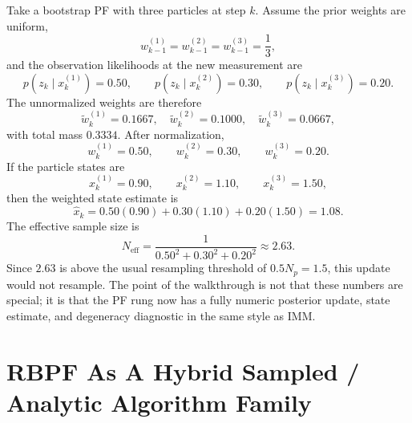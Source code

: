 \documentclass[11pt]{article}
\begin{document}
Take a bootstrap PF with three particles at step \(k\). Assume the prior
weights are uniform,
\begin{equation}
    w_{k-1}^{(1)} = w_{k-1}^{(2)} = w_{k-1}^{(3)} = \frac{1}{3},
\end{equation}
and the observation likelihoods at the new measurement are
\begin{equation}
    p(z_k \mid x_k^{(1)}) = 0.50,\qquad
    p(z_k \mid x_k^{(2)}) = 0.30,\qquad
    p(z_k \mid x_k^{(3)}) = 0.20.
\end{equation}
The unnormalized weights are therefore
\begin{equation}
    \tilde{w}_k^{(1)} = 0.1667,\quad
    \tilde{w}_k^{(2)} = 0.1000,\quad
    \tilde{w}_k^{(3)} = 0.0667,
\end{equation}
with total mass \(0.3334\). After normalization,
\begin{equation}
    w_k^{(1)} = 0.50,\qquad
    w_k^{(2)} = 0.30,\qquad
    w_k^{(3)} = 0.20.
\end{equation}
If the particle states are
\begin{equation}
    x_k^{(1)} = 0.90,\qquad
    x_k^{(2)} = 1.10,\qquad
    x_k^{(3)} = 1.50,
\end{equation}
then the weighted state estimate is
\begin{equation}
    \hat{x}_k
    =
    0.50(0.90) + 0.30(1.10) + 0.20(1.50)
    =
    1.08.
\end{equation}
The effective sample size is
\begin{equation}
    N_{\text{eff}}
    =
    \frac{1}{0.50^2 + 0.30^2 + 0.20^2}
    \approx 2.63.
\end{equation}
Since \(2.63\) is above the usual resampling threshold of \(0.5 N_p = 1.5\),
this update would not resample. The point of the walkthrough is not that these
numbers are special; it is that the PF rung now has a fully numeric posterior
update, state estimate, and degeneracy diagnostic in the same style as IMM.

\section{RBPF As A Hybrid Sampled / Analytic Algorithm Family}
\end{document}
